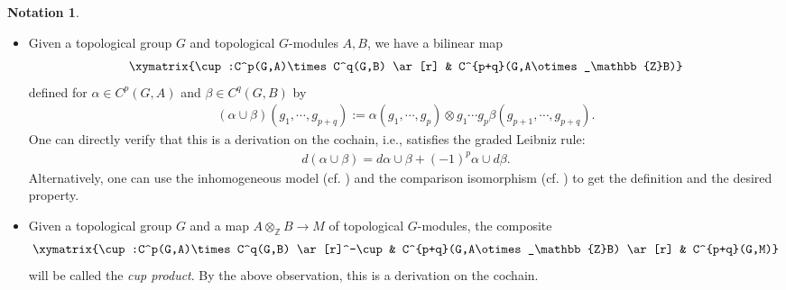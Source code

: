 \documentclass[a4paper]{amsart}
\theoremstyle{definition}
\newtheorem{notation}[thm]{Notation}
\numberwithin{equation}{section}
\begin{document}
\begin{notation}
\begin{itemize}
    See \cite[\href{https://stacks.math.columbia.edu/tag/0DVG}{Tag 0DVG}]{Stacks} for example.
    \item Given a topological group $G$ and topological $G$-modules $A,B$, we have a bilinear map
    \begin{align*}
        \xymatrix{\cup:C^p(G,A)\times C^q(G,B) \ar[r] & C^{p+q}(G,A\otimes_\mathbb{Z}B)}
    \end{align*}
    defined for $\alpha\in C^p(G,A)$ and $\beta\in C^q(G,B)$ by
    \begin{align*}
        (\alpha\cup\beta)(g_1,\cdots,g_{p+q}):=\alpha(g_1,\cdots,g_p)\otimes g_1\cdots g_p\beta(g_{p+1},\cdots,g_{p+q}).
    \end{align*}
    One can directly verify that this is a derivation on the cochain, i.e., satisfies the graded Leibniz rule:
    \begin{align*}
        d(\alpha\cup\beta)=d\alpha\cup\beta+(-1)^p\alpha\cup d\beta.
    \end{align*}
    Alternatively, one can use the inhomogeneous model (cf. \cite[I.4]{NSW08}) and the comparison isomorphism (cf. \cite[p.14]{NSW08}) to get the definition and the desired property.
    \item Given a topological group $G$ and a map $A\otimes_\mathbb{Z}B\rightarrow M$ of topological $G$-modules, the composite
    \begin{align*}
        \xymatrix{\cup:C^p(G,A)\times C^q(G,B) \ar[r]^-\cup & C^{p+q}(G,A\otimes_\mathbb{Z}B) \ar[r] & C^{p+q}(G,M)}
    \end{align*}
    will be called the \emph{cup product}. By the above observation, this is a derivation on the cochain.
\end{itemize}
\end{notation}
\end{document}
